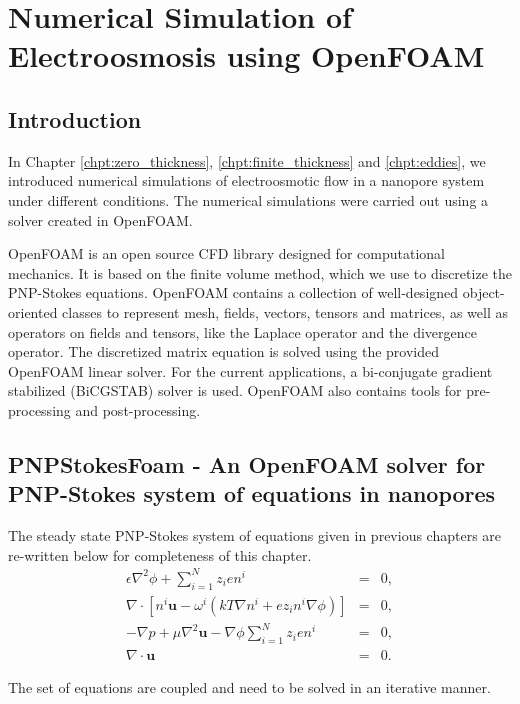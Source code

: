 \chapter{Numerical Simulation of Electroosmosis using OpenFOAM}
\label{chpt:numerical}
\section{Introduction}
In Chapter \ref{chpt:zero_thickness}, \ref{chpt:finite_thickness} and \ref{chpt:eddies}, we introduced numerical simulations of electroosmotic flow in a nanopore system under different conditions. The numerical simulations were carried out using a solver created in OpenFOAM. 

OpenFOAM is an open source CFD library \cite{OPENFOAM} designed for computational mechanics. It is based on the finite volume method, which we use to discretize the PNP-Stokes equations. OpenFOAM contains a collection of well-designed object-oriented classes to represent mesh, fields, vectors, tensors and matrices, as well as operators on fields and tensors, like the Laplace operator and the divergence operator. The discretized matrix equation is solved using the provided OpenFOAM linear solver. For the current applications, a bi-conjugate gradient stabilized (BiCGSTAB) solver is used. OpenFOAM also contains tools for pre-processing and post-processing.

\section{PNPStokesFoam - An OpenFOAM solver for PNP-Stokes system of equations in nanopores}
The steady state PNP-Stokes system of equations given in previous chapters are re-written below for completeness of this chapter. 
\begin{eqnarray}
\epsilon \nabla^2 \phi + \sum_{i=1}^{N} z_ien^i & = & 0,
\label{eq:poisson_num}
\\
\nabla\cdot\left\lbrack n^i\mathbf{u} -\omega^i(kT\nabla
n^i + ez_in^i\nabla\phi) \right\rbrack&=&0 ,
\label{eq:NP_num}
\\ 
-\nabla p + \mu \nabla^2 \mathbf{u} -  \nabla \phi \sum_{i=1}^{N} z_ien^i & = & 0, \label{eq:stokes_num}\\
\nabla \cdot \mathbf{u} & = & 0. \label{eq:continuity_num}
\end{eqnarray} 

The set of equations are coupled and need to be solved in an iterative manner. 


